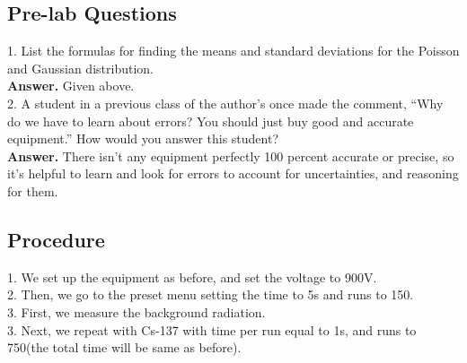 \documentclass[twocolumn]{article}
\begin{document}
\subsection*{Pre-lab Questions}
1. List the formulas for finding the means and standard deviations for the Poisson and Gaussian distribution.\\
\textbf{Answer.} Given above.\\


2. A student in a previous class of the author’s once made the comment, “Why do we have to learn about errors? You should just buy good and accurate equipment.” How would you answer this student?\\
\textbf{Answer.} There isn't any equipment perfectly 100 percent accurate or precise, so it's helpful to learn and look for errors to account for uncertainties, and reasoning for them.

\subsection*{Procedure}
1. We set up the equipment as before, and set the voltage to 900V.\\
2. Then, we go to the preset menu setting the time to 5s and runs to 150.\\
3. First, we measure the background radiation.\\
3. Next, we repeat with Cs-137 with time per run equal to 1s, and runs to 750(the total time will be same as before).\\
\end{document}
